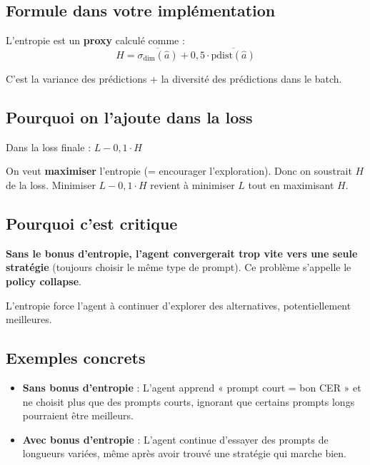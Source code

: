 \documentclass[11pt,a4paper]{article}
\begin{document}
\subsection{Formule dans votre implémentation}

L'entropie est un \textbf{proxy} calculé comme :
\begin{equation}
H = \overline{\sigma_{\text{dim}}(\hat{a})} + 0{,}5 \cdot \overline{\text{pdist}(\hat{a})}
\end{equation}

C'est la variance des prédictions + la diversité des prédictions dans le batch.

\subsection{Pourquoi on l'ajoute dans la loss}

Dans la loss finale : $L - 0{,}1 \cdot H$

On veut \textbf{maximiser} l'entropie (= encourager l'exploration). Donc on soustrait $H$ de la loss. Minimiser $L - 0{,}1 \cdot H$ revient à minimiser $L$ tout en maximisant $H$.

\subsection{Pourquoi c'est critique}

\textbf{Sans le bonus d'entropie, l'agent convergerait trop vite vers une seule stratégie} (toujours choisir le même type de prompt). Ce problème s'appelle le \textbf{policy collapse}.

L'entropie force l'agent à continuer d'explorer des alternatives, potentiellement meilleures.

\subsection{Exemples concrets}

\begin{itemize}
    \item \textbf{Sans bonus d'entropie} : L'agent apprend « prompt court = bon CER » et ne choisit plus que des prompts courts, ignorant que certains prompts longs pourraient être meilleurs.
    
    \item \textbf{Avec bonus d'entropie} : L'agent continue d'essayer des prompts de longueurs variées, même après avoir trouvé une stratégie qui marche bien.
\end{itemize}
\end{document}
